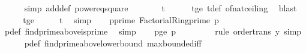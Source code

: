 \begin{isabellebody}
\ \ \ \ \isamarkupfalse%
\ {\isacharparenleft}{\kern0pt}simp\ add{\isacharcolon}{\kern0pt}{\isasymdelta}{\isacharprime}{\kern0pt}{\isacharunderscore}{\kern0pt}def\ power{}{\isacharunderscore}{\kern0pt}eq{\isacharunderscore}{\kern0pt}square{\isacharparenright}{\kern0pt}\isanewline
\ \ \isamarkupfalse%
\ \isamarkupfalse%
\ {\isachardoublequoteopen}{\isachardot}{\kern0pt}{\isachardot}{\kern0pt}{\isachardot}{\kern0pt}\ {\isasymle}\ t{\isachardoublequoteclose}\isanewline
\ \ \ \ \isamarkupfalse%
\ t{\isacharunderscore}{\kern0pt}ge{\isacharunderscore}{\kern0pt}{}\ t{\isacharunderscore}{\kern0pt}def\ of{\isacharunderscore}{\kern0pt}nat{\isacharunderscore}{\kern0pt}ceiling\ \isamarkupfalse%
\ blast\isanewline
\ \ \isamarkupfalse%
\ \isamarkupfalse%
\ t{\isacharunderscore}{\kern0pt}ge{\isacharunderscore}{\kern0pt}{\isasymdelta}{\isacharprime}{\kern0pt}{\isacharcolon}{\kern0pt}\ {\isachardoublequoteopen}\ {}{}\ {\isacharslash}{\kern0pt}\ {\isasymdelta}{\isacharprime}{\kern0pt}\ {\isasymle}\ t{\isachardoublequoteclose}\ \isamarkupfalse%
\ simp\isanewline
\isanewline
\ \ \isamarkupfalse%
\ p{\isacharunderscore}{\kern0pt}prime{\isacharcolon}{\kern0pt}\ {\isachardoublequoteopen}Factorial{\isacharunderscore}{\kern0pt}Ring{\isachardot}{\kern0pt}prime\ p{\isachardoublequoteclose}\ \isanewline
\ \ \ \ \isamarkupfalse%
\ p{\isacharunderscore}{\kern0pt}def\ find{\isacharunderscore}{\kern0pt}prime{\isacharunderscore}{\kern0pt}above{\isacharunderscore}{\kern0pt}is{\isacharunderscore}{\kern0pt}prime\ \isamarkupfalse%
\ simp\isanewline
\ \ \isamarkupfalse%
\ p{\isacharunderscore}{\kern0pt}ge{\isacharunderscore}{\kern0pt}{}{}{\isacharcolon}{\kern0pt}\ {\isachardoublequoteopen}p\ {\isasymge}\ {}{}{\isachardoublequoteclose}\ \isanewline
\ \ \ \ \isamarkupfalse%
\ {\isacharparenleft}{\kern0pt}rule\ order{\isacharunderscore}{\kern0pt}trans{\isacharbrackleft}{\kern0pt}\ y{\isacharequal}{\kern0pt}{\isachardoublequoteopen}{}{}{\isachardoublequoteclose}{\isacharbrackright}{\kern0pt}{\isacharcomma}{\kern0pt}\ simp{\isacharparenright}{\kern0pt}\isanewline
\ \ \ \ \isamarkupfalse%
\ p{\isacharunderscore}{\kern0pt}def\ find{\isacharunderscore}{\kern0pt}prime{\isacharunderscore}{\kern0pt}above{\isacharunderscore}{\kern0pt}lower{\isacharunderscore}{\kern0pt}bound\ max{\isachardot}{\kern0pt}bounded{\isacharunderscore}{\kern0pt}iff\ \isamarkupfalse%

\end{isabellebody}
